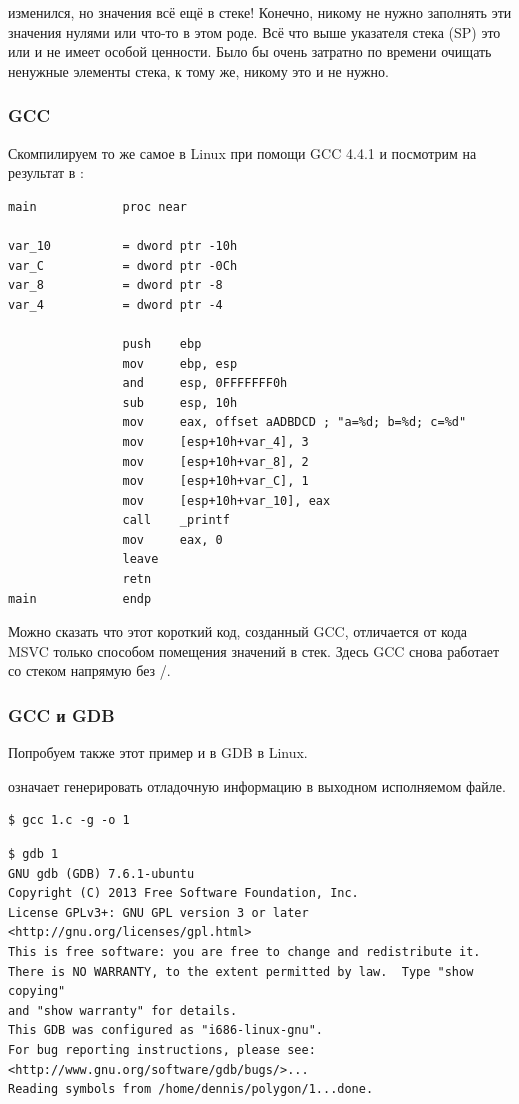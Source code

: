 \ESP изменился, но значения всё ещё в стеке!
Конечно, никому не нужно заполнять эти значения нулями или что-то в этом роде.
Всё что выше указателя стека (\ac{SP}) 
это  или \IT{\garbage{}} и не имеет особой ценности.
Было бы очень затратно по времени очищать ненужные элементы стека, к тому же, никому это и не нужно.

\fi %

\ifdefined\IncludeGCC
\subsubsection{GCC}

Скомпилируем то же самое в Linux при помощи GCC 4.4.1 и посмотрим на результат в \IDA:

\begin{lstlisting}
main            proc near

var_10          = dword ptr -10h
var_C           = dword ptr -0Ch
var_8           = dword ptr -8
var_4           = dword ptr -4

                push    ebp
                mov     ebp, esp
                and     esp, 0FFFFFFF0h
                sub     esp, 10h
                mov     eax, offset aADBDCD ; "a=%d; b=%d; c=%d"
                mov     [esp+10h+var_4], 3
                mov     [esp+10h+var_8], 2
                mov     [esp+10h+var_C], 1
                mov     [esp+10h+var_10], eax
                call    _printf
                mov     eax, 0
                leave
                retn
main            endp
\end{lstlisting}

Можно сказать что этот короткий код, созданный GCC, отличается от кода MSVC только способом помещения 
значений в стек.
Здесь GCC снова работает со стеком напрямую без \PUSH/\POP.

\ifdefined\IncludeGDB
\subsubsection{GCC и GDB}

Попробуем также этот пример и в \ac{GDB} в Linux.

 означает генерировать отладочную информацию в выходном исполняемом файле.

\begin{lstlisting}
$ gcc 1.c -g -o 1
\end{lstlisting}

\begin{lstlisting}
$ gdb 1
GNU gdb (GDB) 7.6.1-ubuntu
Copyright (C) 2013 Free Software Foundation, Inc.
License GPLv3+: GNU GPL version 3 or later <http://gnu.org/licenses/gpl.html>
This is free software: you are free to change and redistribute it.
There is NO WARRANTY, to the extent permitted by law.  Type "show copying"
and "show warranty" for details.
This GDB was configured as "i686-linux-gnu".
For bug reporting instructions, please see:
<http://www.gnu.org/software/gdb/bugs/>...
Reading symbols from /home/dennis/polygon/1...done.
\end{lstlisting}

